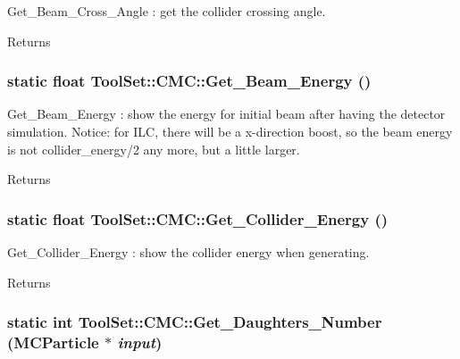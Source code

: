 Get\_\-Beam\_\-Cross\_\-Angle : get the collider crossing angle. \begin{DoxyReturn}{Returns}

\end{DoxyReturn}
\hypertarget{classToolSet_1_1CMC_afaf6f983eee33318bcaf7923cde7266e}{
\subsubsection[{Get\_\-Beam\_\-Energy}]{\setlength{\rightskip}{0pt plus 5cm}static float ToolSet::CMC::Get\_\-Beam\_\-Energy ()}}
\label{classToolSet_1_1CMC_afaf6f983eee33318bcaf7923cde7266e}


Get\_\-Beam\_\-Energy : show the energy for initial beam after having the detector simulation. Notice: for ILC, there will be a x-\/direction boost, so the beam energy is not collider\_\-energy/2 any more, but a little larger.

\begin{DoxyReturn}{Returns}

\end{DoxyReturn}
\hypertarget{classToolSet_1_1CMC_a7143149e3db8c1e5055498c8aba88182}{
\subsubsection[{Get\_\-Collider\_\-Energy}]{\setlength{\rightskip}{0pt plus 5cm}static float ToolSet::CMC::Get\_\-Collider\_\-Energy ()}}
\label{classToolSet_1_1CMC_a7143149e3db8c1e5055498c8aba88182}


Get\_\-Collider\_\-Energy : show the collider energy when generating. \begin{DoxyReturn}{Returns}

\end{DoxyReturn}
\hypertarget{classToolSet_1_1CMC_a44a3b5e5df7effa4ed170151cd63b706}{
\subsubsection[{Get\_\-Daughters\_\-Number}]{\setlength{\rightskip}{0pt plus 5cm}static int ToolSet::CMC::Get\_\-Daughters\_\-Number (MCParticle $\ast$ {\em input})}}
\label{classToolSet_1_1CMC_a44a3b5e5df7effa4ed170151cd63b706}


